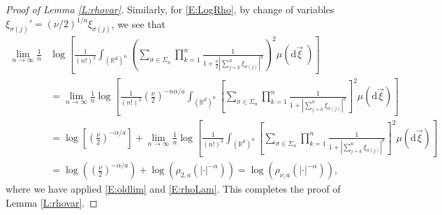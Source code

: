\documentclass[12pt]{report}
\theoremstyle{plain}
\theoremstyle{definition}
\numberwithin{equation}{section}
\newcommand{\R}{\mathbb{R}}
\newcommand{\ud}{\ensuremath{ \mathrm{d} }}
\begin{document}
\begin{proof}[Proof of Lemma \ref{L:rhovar}]
	Similarly, for \eqref{E:LogRho}, by change of variables $\xi_{\sigma(j)}' =
	\left(\nu/2\right)^{1/a} \xi_{\sigma(j)}$, we see that
	\begin{align*}
	\lim_{n \to \infty} \frac{1}{n}
	& \log \left[ \frac{1}{(n!)^2} \int_{(\R^d)^n} \left( \sum_{\sigma \in \Sigma_n} \prod_{k=1}^n \frac{1}{1+ \frac{\nu}{2}|\sum_{j=k}^n \xi_{\sigma(j)}|^a}\right)^2 \mu (\ud \vec{\xi}\:)\right]                                                                                               \\
	& = \lim_{n \to \infty} \frac{1}{n} \log \left[ \frac{1}{(n!)^2}  \left( \frac{\nu}{2} \right)^{-n\alpha/a}  \int_{(\R^d)^n} \left[\sum_{\sigma \in \Sigma_n} \prod_{k=1}^n \frac{1}{1+\left|\sum_{j=k}^n \xi_{\sigma(j)} \right|^a}\right]^2 \mu(\ud \vec{\xi} )\right]                    \\
	& = \log\left[ \left( \frac{\nu}{2} \right)^{-\alpha/a} \right] +  \lim_{n \to \infty} \frac{1}{n} \log \left[ \frac{1}{(n!)^2} \int_{(\R^d)^n} \left[\sum_{\sigma \in \Sigma_n} \prod_{k=1}^n \frac{1}{1+\left|\sum_{j=k}^n \xi_{\sigma(j)} \right|^a}\right]^2 \mu(\ud \vec{\xi} )\right] \\
	& = \log\left( \left( \frac{\nu}{2} \right)^{-\alpha/a} \right) + \log\left( \rho_{2,a} \left(|\cdot|^{-\alpha}\right) \right)
	= \log\left( \rho_{\nu, a} \left(|\cdot|^{-\alpha}\right)\right),
	\end{align*}
	where we have applied \eqref{E:oldlim} and \eqref{E:rhoLam}. This completes the proof of Lemma
	\ref{L:rhovar}.
\end{proof}
\end{document}
